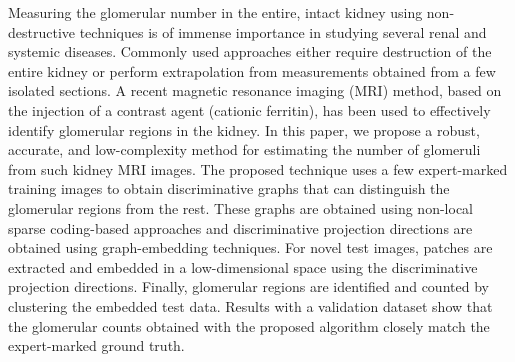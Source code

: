 Measuring the glomerular number in the entire, intact kidney using non-destructive techniques is of immense importance in studying several renal and systemic diseases. Commonly used approaches either require destruction of the entire kidney or perform extrapolation from measurements obtained from a few isolated sections. A recent magnetic resonance imaging (MRI) method, based on the injection of a contrast agent (cationic ferritin), has been used to effectively identify glomerular regions in the kidney. In this paper, we propose a robust, accurate, and low-complexity method for estimating the number of glomeruli from such kidney MRI images.  The proposed technique uses a few expert-marked training images to obtain discriminative graphs that can distinguish the glomerular regions from the rest. These graphs are obtained using non-local sparse coding-based approaches and discriminative projection directions are obtained using graph-embedding techniques. For novel test images, patches are extracted and embedded in a low-dimensional space using the discriminative projection directions. Finally, glomerular regions are identified and counted by clustering the embedded test data. Results with a validation dataset show that the glomerular counts obtained with the proposed algorithm closely match the expert-marked ground truth. 